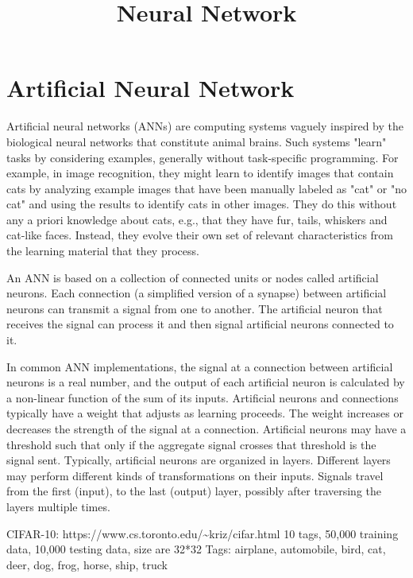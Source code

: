 \documentclass[11pt]{article}
\title{Neural Network}
\begin{document}
    
    
    \maketitle
    
    

    
    \section{Artificial Neural Network}\label{artificial-neural-network}

    Artificial neural networks (ANNs) are computing systems vaguely inspired
by the biological neural networks that constitute animal brains. Such
systems "learn" tasks by considering examples, generally without
task-specific programming. For example, in image recognition, they might
learn to identify images that contain cats by analyzing example images
that have been manually labeled as "cat" or "no cat" and using the
results to identify cats in other images. They do this without any a
priori knowledge about cats, e.g., that they have fur, tails, whiskers
and cat-like faces. Instead, they evolve their own set of relevant
characteristics from the learning material that they process.

An ANN is based on a collection of connected units or nodes called
artificial neurons. Each connection (a simplified version of a synapse)
between artificial neurons can transmit a signal from one to another.
The artificial neuron that receives the signal can process it and then
signal artificial neurons connected to it.

In common ANN implementations, the signal at a connection between
artificial neurons is a real number, and the output of each artificial
neuron is calculated by a non-linear function of the sum of its inputs.
Artificial neurons and connections typically have a weight that adjusts
as learning proceeds. The weight increases or decreases the strength of
the signal at a connection. Artificial neurons may have a threshold such
that only if the aggregate signal crosses that threshold is the signal
sent. Typically, artificial neurons are organized in layers. Different
layers may perform different kinds of transformations on their inputs.
Signals travel from the first (input), to the last (output) layer,
possibly after traversing the layers multiple times.

CIFAR-10: https://www.cs.toronto.edu/\textasciitilde{}kriz/cifar.html 10
tags, 50,000 training data, 10,000 testing data, size are 32*32 Tags:
airplane, automobile, bird, cat, deer, dog, frog, horse, ship, truck
\end{document}
